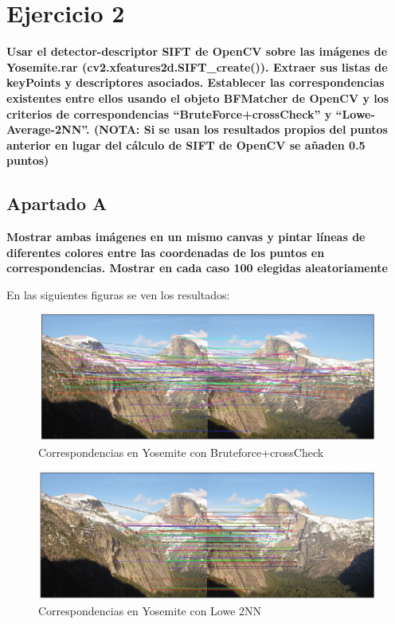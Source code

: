 \documentclass[12pt,spanish]{article} %
\begin{document}
\newpage


\section{Ejercicio 2}

\textbf{
Usar el detector-descriptor SIFT de OpenCV sobre las imágenes de Yosemite.rar (cv2.xfeatures2d.SIFT\_create()). Extraer sus listas de keyPoints y descriptores asociados. Establecer las correspondencias existentes entre ellos usando el objeto BFMatcher de OpenCV y los criterios de correspondencias ``BruteForce+crossCheck'' y ``Lowe-Average-2NN''. (NOTA: Si se usan los resultados propios del puntos anterior en lugar del cálculo de SIFT de OpenCV se añaden 0.5 puntos)
}

\subsection{Apartado A}

\textbf{
Mostrar ambas imágenes en un mismo canvas y pintar líneas de diferentes colores entre las coordenadas de los puntos en correspondencias. Mostrar en cada caso 100 elegidas aleatoriamente
}

En las siguientes figuras se ven los resultados:

\begin{figure}[H]
  \begin{center}
  \includegraphics[scale=.6]{ej2_bf}
  \caption{Correspondencias en Yosemite con Bruteforce+crossCheck}
  \label{fig:ej2_bf}
  \end{center}
\end{figure}

\begin{figure}[H]
  \begin{center}
  \includegraphics[scale=.6]{ej2_2nn}
  \caption{Correspondencias en Yosemite con Lowe 2NN}
  \label{fig:ej2_2nn}
  \end{center}
\end{figure}
\end{document}

